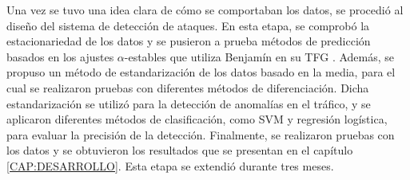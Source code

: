 Una vez se tuvo una idea clara de cómo se comportaban los datos, se procedió al diseño del sistema de detección de ataques. En esta etapa, se comprobó la estacionariedad de los datos y se pusieron a prueba métodos de predicción basados en los ajustes $\alpha$-estables que utiliza Benjamín en su \ac{TFG} \cite{benjamin2021}. Además, se propuso un método de estandarización de los datos basado en la media, para el cual se realizaron pruebas con diferentes métodos de diferenciación. Dicha estandarización se utilizó para la detección de anomalías en el tráfico, y se aplicaron diferentes métodos de clasificación, como \ac{SVM} y regresión logística, para evaluar la precisión de la detección.
Finalmente, se realizaron pruebas con los datos y se obtuvieron los resultados que se presentan en el capítulo \ref{CAP:DESARROLLO}.
Esta etapa se extendió durante tres meses.